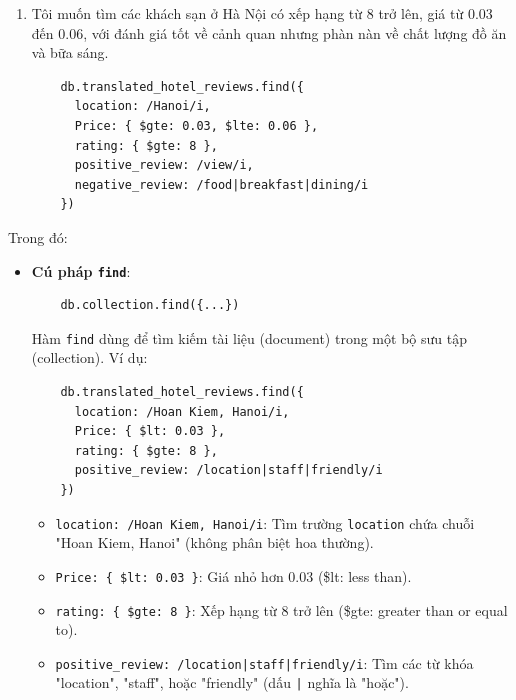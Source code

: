 \begin{enumerate}
    \item Tôi muốn tìm các khách sạn ở Hà Nội có xếp hạng từ 8 trở lên, giá từ 0.03 đến 0.06, với đánh giá tốt về cảnh quan nhưng phàn nàn về chất lượng đồ ăn và bữa sáng.

    \begin{verbatim}
    db.translated_hotel_reviews.find({
      location: /Hanoi/i,
      Price: { $gte: 0.03, $lte: 0.06 },
      rating: { $gte: 8 },
      positive_review: /view/i,
      negative_review: /food|breakfast|dining/i
    })
    \end{verbatim}

\end{enumerate}
Trong đó:

\begin{itemize}
    \item \textbf{Cú pháp \texttt{find}}: 
    \begin{verbatim}
    db.collection.find({...})
    \end{verbatim}
    Hàm \texttt{find} dùng để tìm kiếm tài liệu (document) trong một bộ sưu tập (collection). Ví dụ: 
    \begin{verbatim}
    db.translated_hotel_reviews.find({
      location: /Hoan Kiem, Hanoi/i,
      Price: { $lt: 0.03 },
      rating: { $gte: 8 },
      positive_review: /location|staff|friendly/i
    })
    \end{verbatim}
    \begin{itemize}
        \item \texttt{location: /Hoan Kiem, Hanoi/i}: Tìm trường \texttt{location} chứa chuỗi "Hoan Kiem, Hanoi" (không phân biệt hoa thường).
        \item \texttt{Price: \{ \$lt: 0.03 \}}: Giá nhỏ hơn 0.03 (\$lt: less than).
        \item \texttt{rating: \{ \$gte: 8 \}}: Xếp hạng từ 8 trở lên (\$gte: greater than or equal to).
        \item \texttt{positive\_review: /location|staff|friendly/i}: Tìm các từ khóa "location", "staff", hoặc "friendly" (dấu \texttt{|} nghĩa là "hoặc").
    \end{itemize}


\end{itemize}
